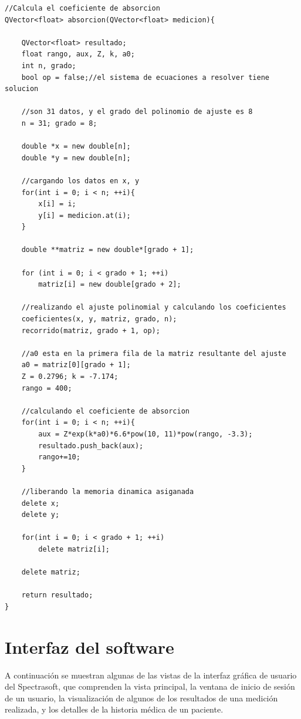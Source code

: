 \begin{itemize}
			\begin{lstlisting}
//Calcula el coeficiente de absorcion
QVector<float> absorcion(QVector<float> medicion){

    QVector<float> resultado;
    float rango, aux, Z, k, a0;
    int n, grado;
    bool op = false;//el sistema de ecuaciones a resolver tiene solucion
    
    //son 31 datos, y el grado del polinomio de ajuste es 8
    n = 31; grado = 8;

    double *x = new double[n];
    double *y = new double[n];

    //cargando los datos en x, y
    for(int i = 0; i < n; ++i){
        x[i] = i;
        y[i] = medicion.at(i);
    }

    double **matriz = new double*[grado + 1];

    for (int i = 0; i < grado + 1; ++i)
        matriz[i] = new double[grado + 2];

    //realizando el ajuste polinomial y calculando los coeficientes
    coeficientes(x, y, matriz, grado, n);
    recorrido(matriz, grado + 1, op);

    //a0 esta en la primera fila de la matriz resultante del ajuste
    a0 = matriz[0][grado + 1];
    Z = 0.2796; k = -7.174;
    rango = 400;

    //calculando el coeficiente de absorcion
    for(int i = 0; i < n; ++i){
        aux = Z*exp(k*a0)*6.6*pow(10, 11)*pow(rango, -3.3);
        resultado.push_back(aux);
        rango+=10;
    }

    //liberando la memoria dinamica asiganada
    delete x;
    delete y;

    for(int i = 0; i < grado + 1; ++i)
        delete matriz[i];

    delete matriz;

    return resultado;
}
			\end{lstlisting}

	\end{itemize}

\newpage

\section{Interfaz del software}

	A continuaci\'{o}n se muestran algunas de las vistas de la interfaz gr\'{a}fica de usuario del Spectrasoft, que comprenden la vista principal, la ventana de inicio de sesi\'{o}n de un usuario, la visualizaci\'{o}n de algunos de los resultados de una medici\'{o}n realizada, y los detalles de la historia m\'{e}dica de un paciente.

